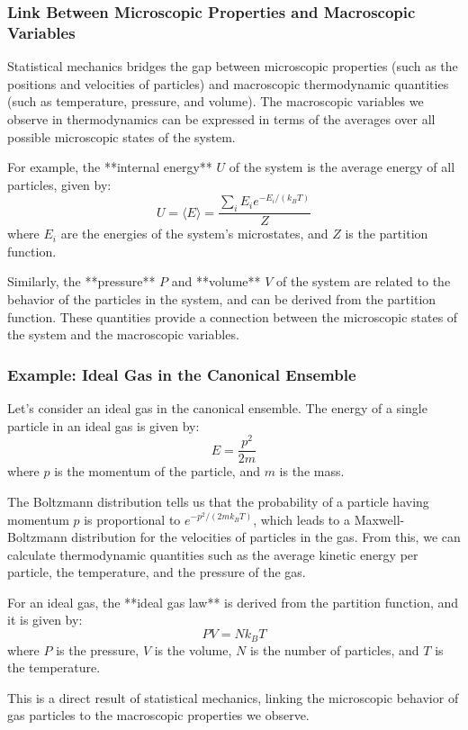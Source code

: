 \documentclass{article}
\begin{document}
\subsubsection*{Link Between Microscopic Properties and Macroscopic Variables}

Statistical mechanics bridges the gap between microscopic properties (such as the positions and velocities of particles) and macroscopic thermodynamic quantities (such as temperature, pressure, and volume). The macroscopic variables we observe in thermodynamics can be expressed in terms of the averages over all possible microscopic states of the system.

For example, the **internal energy** \( U \) of the system is the average energy of all particles, given by:
\[
U = \langle E \rangle = \frac{\sum_{i} E_i e^{-E_i/(k_B T)}}{Z}
\]
where \( E_i \) are the energies of the system's microstates, and \( Z \) is the partition function.

Similarly, the **pressure** \( P \) and **volume** \( V \) of the system are related to the behavior of the particles in the system, and can be derived from the partition function. These quantities provide a connection between the microscopic states of the system and the macroscopic variables.

\subsubsection*{Example: Ideal Gas in the Canonical Ensemble}

Let’s consider an ideal gas in the canonical ensemble. The energy of a single particle in an ideal gas is given by:
\[
E = \frac{p^2}{2m}
\]
where \( p \) is the momentum of the particle, and \( m \) is the mass.

The Boltzmann distribution tells us that the probability of a particle having momentum \( p \) is proportional to \( e^{-p^2/(2m k_B T)} \), which leads to a Maxwell-Boltzmann distribution for the velocities of particles in the gas. From this, we can calculate thermodynamic quantities such as the average kinetic energy per particle, the temperature, and the pressure of the gas.

For an ideal gas, the **ideal gas law** is derived from the partition function, and it is given by:
\[
PV = Nk_B T
\]
where \( P \) is the pressure, \( V \) is the volume, \( N \) is the number of particles, and \( T \) is the temperature.

This is a direct result of statistical mechanics, linking the microscopic behavior of gas particles to the macroscopic properties we observe.
\end{document}
